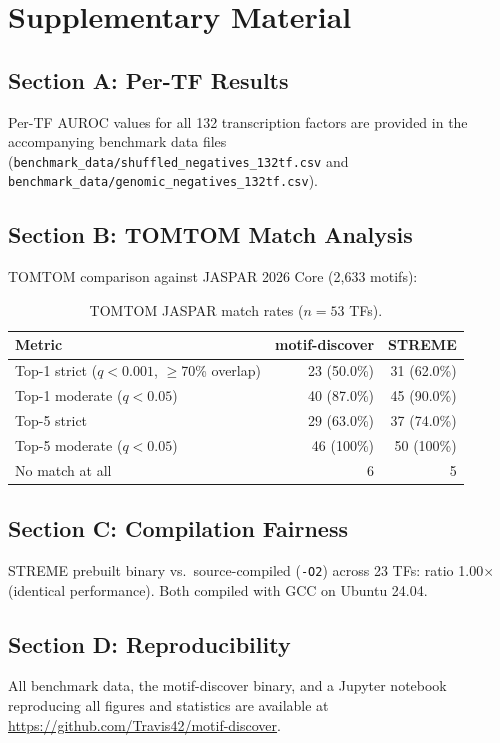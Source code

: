 \section*{Supplementary Material}

\subsection*{Section A: Per-TF Results}

Per-TF AUROC values for all 132 transcription factors are provided in the accompanying benchmark data files (\texttt{benchmark\_data/shuffled\_negatives\_132tf.csv} and \texttt{benchmark\_data/genomic\_negatives\_132tf.csv}).

\subsection*{Section B: TOMTOM Match Analysis}

TOMTOM comparison against JASPAR 2026 Core (2{,}633 motifs):

\begin{table}[H]
\centering
\caption{TOMTOM JASPAR match rates ($n = 53$ TFs).}
\label{tab:supp_tomtom}
\small
\begin{tabular}{lrr}
\toprule
Metric & motif-discover & STREME \\
\midrule
Top-1 strict ($q<0.001$, $\geq$70\% overlap) & 23 (50.0\%) & 31 (62.0\%) \\
Top-1 moderate ($q<0.05$) & 40 (87.0\%) & 45 (90.0\%) \\
Top-5 strict & 29 (63.0\%) & 37 (74.0\%) \\
Top-5 moderate ($q<0.05$) & 46 (100\%) & 50 (100\%) \\
No match at all & 6 & 5 \\
\bottomrule
\end{tabular}
\end{table}

\subsection*{Section C: Compilation Fairness}

STREME prebuilt binary vs.\ source-compiled (\texttt{-O2}) across 23 TFs: ratio 1.00$\times$ (identical performance). Both compiled with GCC on Ubuntu 24.04.

\subsection*{Section D: Reproducibility}

All benchmark data, the motif-discover binary, and a Jupyter notebook reproducing all figures and statistics are available at \url{https://github.com/Travis42/motif-discover}.

